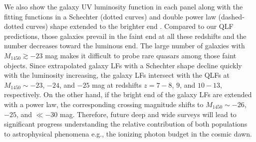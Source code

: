 \documentclass[twocolumn, twocolappendix]{aastex63}
\newcommand{\Muv}{M_{1450}}
\begin{document}
\begin{CJK*}{UTF8}{gbsn}


We also show the galaxy UV luminosity function in each panel
along with the fitting functions in a Schechter (dotted curves) and double power law (dashed-dotted curves) shape extended to the brighter end
\citep{2021AJ....162...47B,2022ApJS..259...20H,2020MNRAS.493.2059B,2022arXiv220712356D,2013MNRAS.432.2696M,2019ApJ...883...99S,
Harikane_2022b,2018ApJ...867..150M,Harikane_2022c,2016ApJ...819..129O,2022arXiv220709434N}.
Compared to our QLF predictions, those galaxies prevail in the faint end at all these redshifts and the number decreases toward the luminous end.
The large number of galaxies with $\Muv\gtrsim -23$ mag makes it difficult to probe rare quasars among those faint objects.
Since extrapolated galaxy LFs with a Schechter shape decline quickly with the luminosity increasing,
the galaxy LFs intersect with the QLFs at $\Muv \sim -23$, $-24$, and $-25$ mag at redshifts $z=7-8$, $9$, and $10-13$, respectively.
On the other hand, if the bright end of the galaxy LFs are extended with a power law, the corresponding crossing magnitude shifts to $\Muv\sim-26$, $-25$, and $\ll -30$ mag.
Therefore, future deep and wide surveys will lead to significant progress understanding the relative 
contribution of both populations to astrophysical phenomena e.g., the ionizing photon budget in the cosmic dawn.




\end{CJK*}
\end{document}

